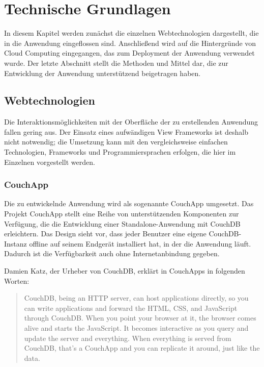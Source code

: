 \chapter{Technische Grundlagen}
\label{chap:grundlagen}

In diesem Kapitel werden zunächst die einzelnen Webtechnologien dargestellt, die in die Anwendung eingeflossen sind. Anschließend wird auf die Hintergründe von Cloud Computing eingegangen, das zum Deployment der Anwendung verwendet wurde. Der letzte Abschnitt stellt die Methoden und Mittel dar, die zur Entwicklung der Anwendung unterstützend beigetragen haben. 


\section{Webtechnologien}
\label{sec:webtechnologien}

Die Interaktionsmöglichkeiten mit der Oberfläche der zu erstellenden Anwendung fallen gering aus. Der Einsatz eines aufwändigen View Frameworks ist deshalb nicht notwendig; die Umsetzung kann mit den vergleichsweise einfachen Technologien, Frameworks und Programmiersprachen erfolgen, die hier im Einzelnen vorgestellt werden. 


\subsection{CouchApp}
\label{subsec:couchapp}

Die zu entwickelnde Anwendung wird als sogenannte CouchApp \cite{couch:couchapp} umgesetzt. Das Projekt CouchApp stellt eine Reihe von unterstützenden Komponenten zur Verfügung, die die Entwicklung einer Standalone-Anwendung mit CouchDB erleichtern. Das Design sieht vor, dass jeder Benutzer eine eigene CouchDB-Instanz offline auf seinem Endgerät installiert hat, in der die Anwendung läuft. Dadurch ist die Verfügbarkeit auch ohne Internetanbindung gegeben.

Damien Katz, der Urheber von CouchDB, erklärt in \cite{couchapp:interview} CouchApps in folgenden Worten:

\begin{quote}
CouchDB, being an HTTP server, can host applications directly, so you can write applications and forward the HTML, CSS, and JavaScript through CouchDB. When you point your browser at it, the browser comes alive and starts the JavaScript. It becomes interactive as you query and update the server and everything. When everything is served from CouchDB, that's a CouchApp and you can replicate it around, just like the data. 
\end{quote}

